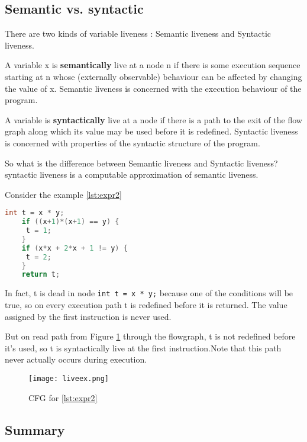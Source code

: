 \subsection{Semantic vs. syntactic}


There are two kinds of variable liveness : Semantic liveness and Syntactic liveness.


A variable x is \textbf{semantically} live at a node n if there is
some execution sequence starting at n whose (externally
observable) behaviour can be affected by changing the
value of x. Semantic liveness is concerned with
the execution behaviour of the program.

A variable is \textbf{syntactically} live at a node if there is a
path to the exit of the flow graph along which its
value may be used before it is redefined. Syntactic liveness is concerned with properties of
the syntactic structure of the program.


So what is the difference between Semantic liveness and Syntactic liveness? syntactic liveness
is a computable approximation of semantic liveness.


Consider the example \ref{lst:expr2}


\begin{lstlisting}[language=C,frame=single, caption=An example to illustrate semantic syntatic,label = lst:expr2]
    int t = x * y;
    if ((x+1)*(x+1) == y) {
     t = 1;
    }
    if (x*x + 2*x + 1 != y) {
     t = 2;
    }
    return t;
\end{lstlisting}

In fact, t is dead in node \texttt{int t = x * y;} because one of the conditions will be true,
so on every execution path t is redefined before it is returned.
The value assigned by the first instruction is never used.


But on read path from Figure \ref{fig:liveex} through the
flowgraph, t is not
redefined before it's used,
so t is syntactically live at
the first instruction.Note that this path never
actually occurs during
execution.

\begin{figure}[h]
	\centering
	\texttt{[image: liveex.png]}
	\caption{CFG for \ref{lst:expr2}}
	\label{fig:liveex}
\end{figure}


\subsection{Summary}


